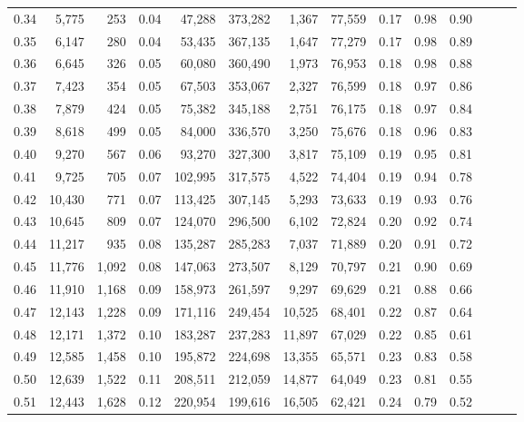 \begin{tabular}{rrrrrrrrrrrrrr}
0.34 &   5,775 &    253 &  0.04 &   47,288 &  373,282 &   1,367 &  77,559 &  0.17 &  0.98 &      0.90 \\
0.35 &   6,147 &    280 &  0.04 &   53,435 &  367,135 &   1,647 &  77,279 &  0.17 &  0.98 &      0.89 \\
0.36 &   6,645 &    326 &  0.05 &   60,080 &  360,490 &   1,973 &  76,953 &  0.18 &  0.98 &      0.88 \\
0.37 &   7,423 &    354 &  0.05 &   67,503 &  353,067 &   2,327 &  76,599 &  0.18 &  0.97 &      0.86 \\
0.38 &   7,879 &    424 &  0.05 &   75,382 &  345,188 &   2,751 &  76,175 &  0.18 &  0.97 &      0.84 \\
0.39 &   8,618 &    499 &  0.05 &   84,000 &  336,570 &   3,250 &  75,676 &  0.18 &  0.96 &      0.83 \\
0.40 &   9,270 &    567 &  0.06 &   93,270 &  327,300 &   3,817 &  75,109 &  0.19 &  0.95 &      0.81 \\
0.41 &   9,725 &    705 &  0.07 &  102,995 &  317,575 &   4,522 &  74,404 &  0.19 &  0.94 &      0.78 \\
0.42 &  10,430 &    771 &  0.07 &  113,425 &  307,145 &   5,293 &  73,633 &  0.19 &  0.93 &      0.76 \\
0.43 &  10,645 &    809 &  0.07 &  124,070 &  296,500 &   6,102 &  72,824 &  0.20 &  0.92 &      0.74 \\
0.44 &  11,217 &    935 &  0.08 &  135,287 &  285,283 &   7,037 &  71,889 &  0.20 &  0.91 &      0.72 \\
0.45 &  11,776 &  1,092 &  0.08 &  147,063 &  273,507 &   8,129 &  70,797 &  0.21 &  0.90 &      0.69 \\
0.46 &  11,910 &  1,168 &  0.09 &  158,973 &  261,597 &   9,297 &  69,629 &  0.21 &  0.88 &      0.66 \\
0.47 &  12,143 &  1,228 &  0.09 &  171,116 &  249,454 &  10,525 &  68,401 &  0.22 &  0.87 &      0.64 \\
0.48 &  12,171 &  1,372 &  0.10 &  183,287 &  237,283 &  11,897 &  67,029 &  0.22 &  0.85 &      0.61 \\
0.49 &  12,585 &  1,458 &  0.10 &  195,872 &  224,698 &  13,355 &  65,571 &  0.23 &  0.83 &      0.58 \\
0.50 &  12,639 &  1,522 &  0.11 &  208,511 &  212,059 &  14,877 &  64,049 &  0.23 &  0.81 &      0.55 \\
0.51 &  12,443 &  1,628 &  0.12 &  220,954 &  199,616 &  16,505 &  62,421 &  0.24 &  0.79 &      0.52 \\

\end{tabular}
